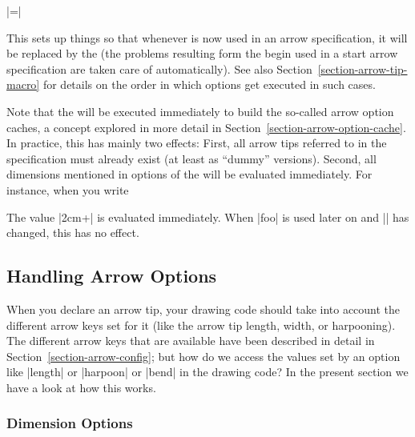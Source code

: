 \begin{command}{\pgfdeclarearrow{}}
\begin{itemize}
            \smallskip
            |=|

            This sets up things so that whenever  is now used in an
            arrow specification, it will be replaced by the  (the problems resulting form the  begin
            used in a start arrow  specification are taken care of
            automatically). See also Section~\ref{section-arrow-tip-macro} for
            details on the order in which options get executed in such cases.

            Note that the  will be executed
            immediately to build the so-called arrow option caches, a concept
            explored in more detail in
            Section~\ref{section-arrow-option-cache}. In practice, this has
            mainly two effects: First, all arrow tips referred to in the
            specification must already exist (at least as ``dummy'' versions).
            Second, all dimensions mentioned in options of the  will be evaluated immediately. For instance, when
            you write
\begin{codeexample}
\end{codeexample}
            The value |2cm+\mydimen| is evaluated immediately. When |foo| is
            used later on and |\mydimen| has changed, this has no effect.
    \end{itemize}
\end{command}


\subsection{Handling Arrow Options}
\label{section-arrow-options}

When you declare an arrow tip, your drawing code should take into account the
different arrow keys set for it (like the arrow tip length, width, or
harpooning). The different arrow keys that are available have been described in
detail in Section~\ref{section-arrow-config}; but how do we access the values
set by an option like |length| or |harpoon| or |bend| in the drawing code? In
the present section we have a look at how this works.


\subsubsection{Dimension Options}

